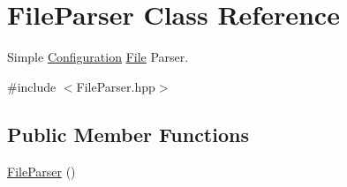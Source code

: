 \hypertarget{classFileParser}{
\section{FileParser Class Reference}
\label{classFileParser}
}


Simple \hyperlink{classConfiguration}{Configuration} \hyperlink{classFile}{File} Parser.  




{\ttfamily \#include $<$FileParser.hpp$>$}

\subsection*{Public Member Functions}
\begin{DoxyCompactItemize}
\item 
\hypertarget{classFileParser_acb58172b4650cd8015d5e8cad7d29647}{
\hyperlink{classFileParser_acb58172b4650cd8015d5e8cad7d29647}{FileParser} ()}
\label{classFileParser_acb58172b4650cd8015d5e8cad7d29647}


\end{DoxyCompactItemize}
